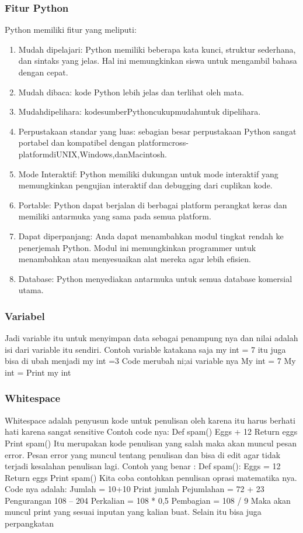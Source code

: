 \subsubsection{Fitur Python}
Python memiliki fitur yang meliputi:
	\begin{enumerate}
		\item Mudah dipelajari: Python memiliki beberapa kata kunci, struktur sederhana, dan sintaks yang jelas. Hal ini memungkinkan siswa untuk mengambil bahasa dengan cepat.
		\item Mudah dibaca: kode Python lebih jelas dan terlihat oleh mata.
		\item Mudahdipelihara: kodesumberPythoncukupmudahuntuk dipelihara.
		\item Perpustakaan standar yang luas: sebagian besar perpustakaan Python sangat portabel dan kompatibel dengan platformcross-platformdiUNIX,Windows,danMacintosh. 
		\item Mode Interaktif: Python memiliki dukungan untuk mode interaktif yang memungkinkan pengujian interaktif dan debugging dari cuplikan kode.
		\item Portable: Python dapat berjalan di berbagai platform perangkat keras dan memiliki antarmuka yang sama pada semua platform.
		\item Dapat diperpanjang: Anda dapat menambahkan modul tingkat rendah ke penerjemah Python. Modul ini memungkinkan programmer untuk menambahkan atau menyesuaikan alat mereka agar lebih eﬁsien.
		\item Database: Python menyediakan antarmuka untuk semua database komersial utama. 
	\end{enumerate}
		
\subsubsection{Variabel}	
 Jadi variable itu untuk menyimpan data sebagai penampung nya dan nilai adalah isi dari variable itu sendiri.
Contoh variable katakana saja my int = 7 itu juga bisa di ubah menjadi my int =3  
Code merubah ni;ai variable nya  
	My int = 7
	My int = 
	Print my int 

\subsubsection{Whitespace} 
Whitespace adalah penyusun kode untuk penulisan oleh karena itu harus berhati hati karena sangat sensitive
Contoh code nya: 
 	Def spam() 
	Eggs + 12 
 	Return eggs 
 	Print spam() 
Itu merupakan kode penulisan yang salah maka akan muncul pesan error.
Pesan error yang muncul tentang penulisan dan bisa di edit agar tidak terjadi kesalahan penulisan lagi.
Contoh yang benar :  
 	Def spam(): 
 	Eggs = 12 
 	Return eggs 
 	Print spam() 
Kita coba contohkan penulisan oprasi matematika nya.
Code nya adalah: 
	Jumlah = 10+10 
	Print jumlah 
	Pejumlahan = 72 + 23 
	Pengurangan 108 – 204 
	Perkalian = 108 * 0,5 
	Pembagian = 108 / 9 
Maka akan muncul print yang sesuai inputan yang kalian buat. 
Selain itu bisa juga perpangkatan 

